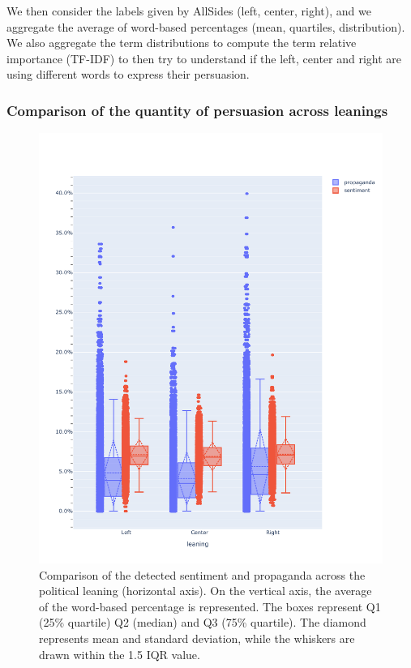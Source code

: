 We then consider the labels given by AllSides (left, center, right), and we aggregate the average of word-based percentages (mean, quartiles, distribution). %
We also aggregate the term distributions to compute the term relative importance (TF-IDF) to then try to understand if the left, center and right are using different words to express their persuasion.

\subsubsection{Comparison of the quantity of persuasion across leanings}

\begin{figure}[!htbp]
    \centering
    \includegraphics[width=\linewidth]{figures/prop_sent_tech_across_leaning_headlines_mod.pdf} %
    \caption{Comparison of the detected sentiment and propaganda across the political leaning (horizontal axis). On the vertical axis, the average of the word-based percentage is represented. The boxes represent Q1 (25\% quartile) Q2 (median) and Q3 (75\% quartile). The diamond represents mean and standard deviation, while the whiskers are drawn within the 1.5 IQR value.}
    \label{fig:prop_sent_across_leaning}
\end{figure}


